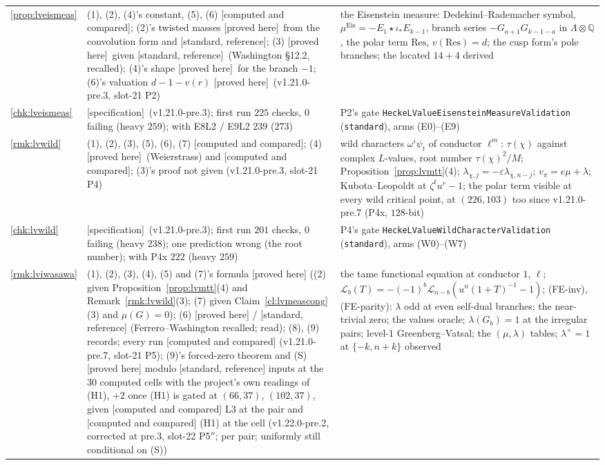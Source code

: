 \documentclass[11pt]{article}
\theoremstyle{remark}
\newcommand{\Q}{\mathbb{Q}}
\newcommand{\PROVED}{\textsf{[proved here]}}
\newcommand{\STD}{\textsf{[standard, reference]}}
\newcommand{\CMPD}{\textsf{[computed and compared]}}   %
\newcommand{\SPEC}{\textsf{[specification]}}           %
\begin{document}
\begin{center}
\begin{longtable}{@{}l>{\raggedright\arraybackslash}p{3.6cm}>{\raggedright\arraybackslash}p{10.6cm}@{}}
\ref{prop:lveismeas} & (1), (2), (4)'s constant, (5), (6) \CMPD; (2)'s twisted masses \PROVED\ from the convolution form and \STD; (3) \PROVED\ given \STD\ (Washington \S12.2, recalled); (4)'s shape \PROVED\ for the branch $-1$; (6)'s valuation $d-1-v(r)$ \PROVED\ (v1.21.0-pre.3, slot-21 P2) & the Eisenstein measure: Dedekind--Rademacher symbol, $\mu^{\mathrm{Eis}}=-E_1\star\iota_\ast E_{k-1}$, branch series $-G_{a+1}G_{k-1-a}$ in $\Lambda\otimes\Q$, the polar term $\mathrm{Res}$, $v(\mathrm{Res})=d$; the cusp form's pole branches; the located $14+4$ derived \\
\ref{chk:lveismeas} & \SPEC\ (v1.21.0-pre.3); first run $225$ checks, $0$ failing (heavy $259$); with E8L2 / E9L2 $239$ ($273$) & P2's gate \texttt{HeckeLValueEisensteinMeasureValidation} (\texttt{standard}), arms (E0)--(E9) \\
\ref{rmk:lvwild} & (1), (2), (3), (5), (6), (7) \CMPD; (4) \PROVED\ (Weierstrass) and \CMPD; (3)'s proof not given (v1.21.0-pre.3, slot-21 P4) & wild characters $\omega^{i}\psi_t$ of conductor $\ell^{m}$: $\tau(\chi)$ against complex $L$-values, root number $\tau(\chi)^{2}/M$; Proposition~\ref{prop:lvmtt}(4); $\lambda_{\chi,j}=-\varepsilon\lambda_{\bar\chi,n-j}$; $v_\pi=e\mu+\lambda$; Kubota--Leopoldt at $\zeta^{t}u^{r}-1$; the polar term visible at every wild critical point, at $(226,103)$ too since v1.21.0-pre.7 (P4x, $128$-bit) \\
\ref{chk:lvwild} & \SPEC\ (v1.21.0-pre.3); first run $201$ checks, $0$ failing (heavy $238$); one prediction wrong (the root number); with P4x $222$ (heavy $259$) & P4's gate \texttt{HeckeLValueWildCharacterValidation} (\texttt{standard}), arms (W0)--(W7)  \\
\ref{rmk:lviwasawa} & (1), (2), (3), (4), (5) and (7)'s formula \PROVED{} ((2) given Proposition~\ref{prop:lvmtt}(4) and Remark~\ref{rmk:lvwild}(3); (7) given Claim~\ref{cl:lvmeascong}(3) and $\mu(G)=0$); (6) \PROVED{} / \STD{} (Ferrero--Washington recalled; \cite{hho} read); (8), (9) records; every run \CMPD{} (v1.21.0-pre.7, slot-21 P5); (9)'s forced-zero theorem and (S) \PROVED{} modulo \STD{} inputs at the $30$ computed cells with the project's own readings of (H1), $+2$ once (H1) is gated at $(66,37)$, $(102,37)$, given \CMPD{} L3 at the pair and \CMPD{} (H1) at the cell (v1.22.0-pre.2, corrected at pre.3, slot-22 P5$''$; per pair; uniformly still conditional on (S)) & the tame functional equation at conductor $1$, $\ell$; $\mathcal L_b(T)=-(-1)^{b}\mathcal L_{n-b}(u^{n}(1+T)^{-1}-1)$; (FE-inv), (FE-parity): $\lambda$ odd at even self-dual branches; the near-trivial zero; the values oracle; $\lambda(G_b)=1$ at the irregular pairs; level-$1$ Greenberg--Vatsal; the $(\mu,\lambda)$ tables; $\lambda^{+}=1$ at $\{-k,n+k\}$ observed \\

\end{longtable}
\end{center}
\end{document}
